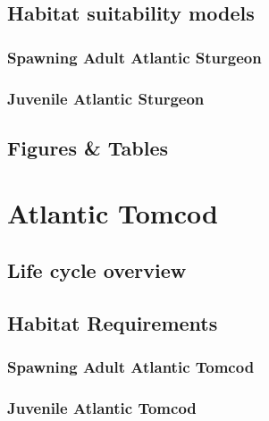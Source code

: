 \documentclass[
]{book}
\begin{document}
\hypertarget{habitat-suitability-models-4}{%
\section{Habitat suitability models}\label{habitat-suitability-models-4}}

\hypertarget{spawning-adult-atlantic-sturgeon-1}{%
\subsection{Spawning Adult Atlantic Sturgeon}\label{spawning-adult-atlantic-sturgeon-1}}

\hypertarget{juvenile-atlantic-sturgeon-1}{%
\subsection{Juvenile Atlantic Sturgeon}\label{juvenile-atlantic-sturgeon-1}}

\hypertarget{figures-tables-4}{%
\section{Figures \& Tables}\label{figures-tables-4}}

\hypertarget{atlantic-tomcod}{%
\chapter{Atlantic Tomcod}\label{atlantic-tomcod}}

\hypertarget{life-cycle-overview-5}{%
\section{Life cycle overview}\label{life-cycle-overview-5}}

\hypertarget{habitat-requirements-5}{%
\section{Habitat Requirements}\label{habitat-requirements-5}}

\hypertarget{spawning-adult-atlantic-tomcod}{%
\subsection{Spawning Adult Atlantic Tomcod}\label{spawning-adult-atlantic-tomcod}}

\hypertarget{juvenile-atlantic-tomcod}{%
\subsection{Juvenile Atlantic Tomcod}\label{juvenile-atlantic-tomcod}}
\end{document}
